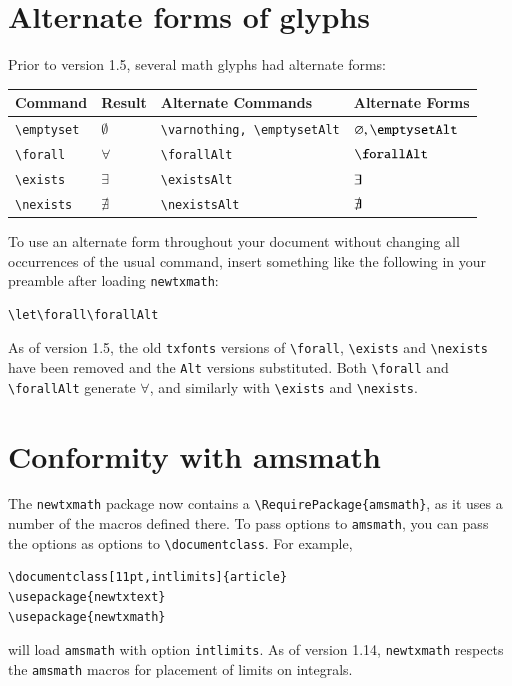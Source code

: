 \documentclass[\fsc]{article}
\theoremstyle{oldplain}
\theoremstyle{plain}
\begin{document}
\section{Alternate forms of glyphs}
Prior to version 1.5, several math glyphs had alternate forms:
\begin{center}
  \begin{tabular}{@{} llll @{}}
    \hline
    Command & Result &  Alternate Commands & Alternate Forms\\ 
    \hline
    \verb|\emptyset| & $\emptyset$ & \verb|\varnothing, \emptysetAlt|& $\varnothing, \emptysetAlt$ \\ 
    \verb|\forall| & $\forall$ & \verb|\forallAlt| & $\forallAlt$ \\ 
    \verb|\exists| & $\exists$ & \verb|\existsAlt| & $\exists$ \\ 
    \verb|\nexists| & $\nexists$ & \verb|\nexistsAlt| & $\nexists$ \\ 
    \hline
  \end{tabular}
\end{center}

To use an alternate form throughout your document without changing all occurrences of the usual command, insert something like the following in your preamble after loading \texttt{newtxmath}:
\begin{verbatim}
\let\forall\forallAlt
\end{verbatim}
As of version 1.5, the old {\tt txfonts} versions of \verb|\forall|, \verb|\exists| and \verb|\nexists| have been removed and the {\tt Alt} versions substituted. Both \verb|\forall| and \verb|\forallAlt| generate $\forall$, and similarly with \verb|\exists| and \verb|\nexists|.

\section{Conformity with amsmath}
The {\tt newtxmath} package now contains a \verb|\RequirePackage{amsmath}|, as it uses a number of the macros defined there. To pass options to {\tt amsmath}, you can pass the options as options to \verb|\documentclass|. For example,
\begin{verbatim}
\documentclass[11pt,intlimits]{article}
\usepackage{newtxtext}
\usepackage{newtxmath}
\end{verbatim}
will load {\tt amsmath} with option {\tt intlimits}. As of version 1.14, {\tt newtxmath} respects the {\tt amsmath} macros for placement of limits on integrals.
\end{document}
